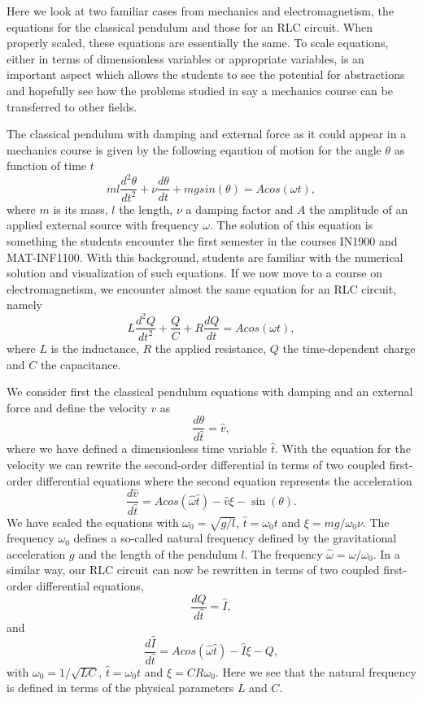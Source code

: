 \documentclass[graybox,envcountchap,sectrefs]{svmult}
\begin{document}
Here we look at two familiar cases from
mechanics and electromagnetism, the equations for the classical
pendulum and those for an RLC circuit.  When properly scaled, these
equations are essentially the same. To scale equations,
either in terms of dimensionless variables or appropriate variables,
is an important aspect which allows the students to see the potential
for abstractions and hopefully see how the problems studied in say a
mechanics course can be transferred to other fields.

The classical pendulum with damping and external force as it could
appear in a mechanics course is given by the following eqaution of
motion for the angle $\theta$ as function of time $t$
\[
  ml\frac{d^2\theta}{dt^2}+\nu\frac{d\theta}{dt}  +mgsin(\theta)=Acos(\omega t),
\]
where $m$ is its mass, $l$ the length, $\nu$ a damping factor and $A$
the amplitude of an applied external source with frequency
$\omega$. The solution of this equation is something the students
encounter the first semester in the courses IN1900 and
MAT-INF1100. With this background, students are familiar with the numerical solution and visualization of such equations.
If we now move to a course on
electromagnetism, we encounter almost the same equation for an RLC
circuit, namely
\[
L\frac{d^2Q}{dt^2}+\frac{Q}{C}+R\frac{dQ}{dt}=Acos(\omega t),
\]
where $L$ is the inductance, $R$ the applied resistance, $Q$ the
time-dependent charge and $C$ the capacitance.

We consider first the
classical pendulum equations with damping and an external force and  define the velocity $v$ as
\[
   \frac{d\theta}{d\hat{t}} =\hat{v},
\]
where we have defined a dimensionless time variable $\hat{t}$. With
the equation for the velocity we can rewrite the second-order
differential in terms of two coupled first-order differential
equations where the second equation represents the acceleration
\[
   \frac{d\hat{v}}{d\hat{t}} =Acos(\hat{\omega} \hat{t})-\hat{v}\xi-\sin(\theta).
\]
We have scaled the  equations with $\omega_0=\sqrt{g/l}$,
$\hat{t}=\omega_0 t$ and $\xi = mg/\omega_0\nu$. The frequency
$\omega_0$ defines a so-called natural frequency defined by the
gravitational acceleration $g$ and the length of the pendulum $l$. The
frequency $\hat{\omega}= \omega/\omega_0$.  In a similar way, our RLC
circuit can now be rewritten in terms of two coupled first-order
differential equations,
\[
   \frac{dQ}{d\hat{t}} =\hat{I},
\]
and
\[
   \frac{d\hat{I}}{d\hat{t}} =Acos(\hat{\omega} \hat{t})-\hat{I}\xi-Q,
\]
with $\omega_0=1/\sqrt{LC}$, $\hat{t}=\omega_0 t$ and $\xi =
CR\omega_0$. Here we see that the natural frequency is defined in
terms of the physical parameters $L$ and $C$.
\end{document}
